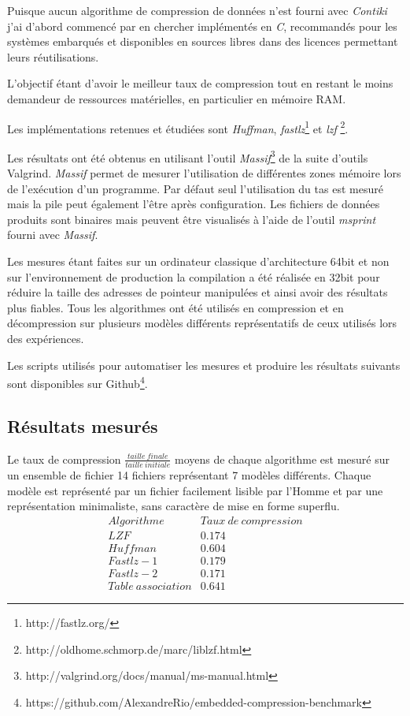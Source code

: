 Puisque aucun algorithme de compression de données n'est fourni avec \emph{Contiki} j'ai d'abord commencé par en chercher implémentés en \emph{C}, recommandés pour les systèmes embarqués et disponibles en sources libres dans des licences permettant leurs réutilisations.

L'objectif étant d'avoir le meilleur taux de compression tout en restant le moins demandeur de ressources matérielles, en particulier en mémoire RAM.

Les implémentations retenues et étudiées sont \emph{Huffman}, \emph{fastlz}\footnote{http://fastlz.org/} et \emph{lzf} \footnote{http://oldhome.schmorp.de/marc/liblzf.html}.

Les résultats ont été obtenus en utilisant l'outil \emph{Massif}\footnote{http://valgrind.org/docs/manual/ms-manual.html} de la suite d'outils Valgrind. \emph{Massif} permet de mesurer l'utilisation de différentes zones mémoire lors de l'exécution d'un programme. Par défaut seul l'utilisation du tas est mesuré mais la pile peut également l'être après configuration. Les fichiers de données produits sont binaires mais peuvent être visualisés à l'aide de l'outil \emph{msprint} fourni avec \emph{Massif}.

Les mesures étant faites sur un ordinateur classique d'architecture 64bit et non sur l'environnement de production la compilation a été réalisée en 32bit pour réduire la taille des adresses de pointeur manipulées et ainsi avoir des résultats plus fiables. Tous les algorithmes ont été utilisés en compression et en décompression sur plusieurs modèles différents représentatifs de ceux utilisés lors des expériences.

Les scripts utilisés pour automatiser les mesures et produire les résultats suivants sont disponibles sur Github\footnote{https://github.com/AlexandreRio/embedded-compression-benchmark}.

\subsection{Résultats mesurés}

Le taux de compression $\frac{taille~finale}{taille~initiale}$ moyens de chaque algorithme est mesuré sur un ensemble de fichier 14 fichiers représentant 7 modèles différents. Chaque modèle est représenté par un fichier facilement lisible par l'Homme et par une représentation minimaliste, sans caractère de mise en forme superflu.
\[
\begin{array}{lc}
Algorithme & Taux~de~compression \\
LZF & 0.174 \\
Huffman & 0.604 \\
Fastlz-1 & 0.179 \\
Fastlz-2 & 0.171 \\
Table~association & 0.641
\end{array}
\]

